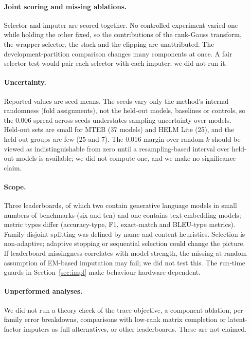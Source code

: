 \documentclass{article}
\begin{document}
\paragraph{Joint scoring and missing ablations.} Selector and imputer are scored together. No controlled experiment varied one while holding the other fixed, so the contributions of the rank-Gauss transform, the wrapper selector, the stack and the clipping are unattributed. The development-partition comparison changes many components at once. A fair selector test would pair each selector with each imputer; we did not run it.

\paragraph{Uncertainty.} Reported values are seed means. The seeds vary only the method's internal randomness (fold assignments), not the held-out models, baselines or controls, so the 0.006 spread across seeds understates sampling uncertainty over models. Held-out sets are small for MTEB (37 models) and HELM Lite (25), and the held-out groups are few (25 and 7). The 0.016 margin over random-$k$ should be viewed as indistinguishable from zero until a resampling-based interval over held-out models is available; we did not compute one, and we make no significance claim.

\paragraph{Scope.} Three leaderboards, of which two contain generative language models in small numbers of benchmarks (six and ten) and one contains text-embedding models; metric types differ (accuracy-type, F1, exact-match and BLEU-type metrics). Family-disjoint splitting was defined by name and content heuristics. Selection is non-adaptive; adaptive stopping or sequential selection could change the picture. If leaderboard missingness correlates with model strength, the missing-at-random assumption of EM-based imputation \citep{Rubin1976Inference} may fail; we did not test this. The run-time guards in Section~\ref{sec:impl} make behaviour hardware-dependent.

\paragraph{Unperformed analyses.} We did not run a theory check of the trace objective, a component ablation, per-family error breakdowns, comparisons with low-rank matrix completion or latent-factor imputers as full alternatives, or other leaderboards. These are not claimed.
\end{document}
